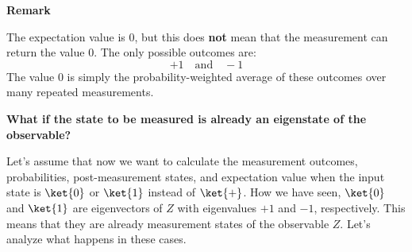 \begin{flushleft}
    \textcolor{Red2}{ \textbf{Remark}}
\end{flushleft}
The expectation value is $0$, but this does \textbf{not} mean that the measurement can return the value $0$. The only possible outcomes are:
\begin{equation*}
    +1
    \quad
    \text{and}
    \quad
    -1
\end{equation*}
The value $0$ is simply the probability-weighted average of these outcomes over many repeated measurements.

\highspace
\begin{flushleft}
    \textcolor{Green3}{ \textbf{What if the state to be measured is already an eigenstate of the observable?}}
\end{flushleft}
Let's assume that now we want to calculate the measurement outcomes, probabilities, post-measurement states, and expectation value when the input state is $\ket{0}$ or $\ket{1}$ instead of $\ket{+}$. How we have seen, $\ket{0}$ and $\ket{1}$ are eigenvectors of $Z$ with eigenvalues $+1$ and $-1$, respectively. This means that they are already measurement states of the observable $Z$. Let's analyze what happens in these cases.
